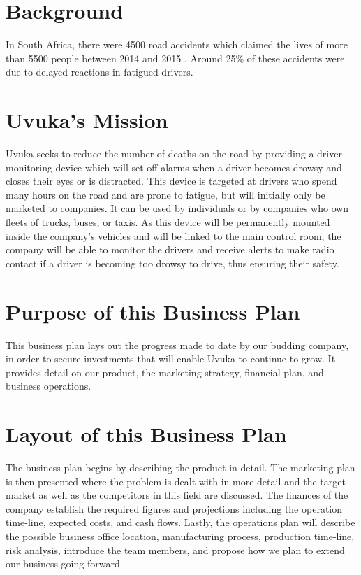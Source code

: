 \section{Background}
In South Africa, there were 4500 road accidents which claimed the lives of more than 5500 people between 2014 and 2015 \cite{EWNRoadDeaths}. Around 25\% of these accidents were due to delayed reactions in fatigued drivers.

\section{Uvuka's Mission}
Uvuka seeks to reduce the number of deaths on the road by providing a driver-monitoring device which will set off alarms when a driver becomes drowsy and closes their eyes or is distracted. This device is targeted at drivers who spend many hours on the road and are prone to fatigue, but will initially only be marketed to companies. It can be used by individuals or by companies who own fleets of trucks, buses, or taxis. As this device will be permanently mounted inside the company's vehicles and will be linked to the main control room, the company will be able to monitor the drivers and receive alerts to make radio contact if a driver is becoming too drowsy to drive, thus ensuring their safety.

\section{Purpose of this Business Plan}
This business plan lays out the progress made to date by our budding company, in order to secure investments that will enable Uvuka to continue to grow. It provides detail on our product, the marketing strategy, financial plan, and business operations.

\section{Layout of this Business Plan}
The business plan begins by describing the product in detail. The marketing plan is then presented where the problem is dealt with in more detail and the target market as well as the competitors in this field are discussed. The finances of the company establish the required figures and projections including the operation time-line, expected costs, and cash flows. Lastly, the operations plan will describe the possible business office location, manufacturing process, production time-line, risk analysis, introduce the team members, and propose how we plan to extend our business going forward.

